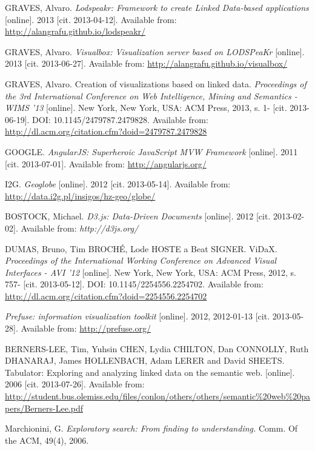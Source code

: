 \begin{thebibliography}{99}
{\sc GRAVES,} Alvaro. 
\emph{Lodspeakr: Framework to create Linked Data-based applications} [online].
2013 [cit. 2013-04-12]. 
Available from: \url{http://alangrafu.github.io/lodspeakr/}

{\sc GRAVES,} Alvaro.
\emph{Visualbox: Visualization server based on LODSPeaKr} [online].
2013 [cit. 2013-06-27].
Available from: \url{http://alangrafu.github.io/visualbox/}

{\sc GRAVES,} Alvaro.
Creation of visualizations based on linked data.
\emph{Proceedings of the 3rd International Conference on Web Intelligence, Mining and Semantics - WIMS '13} [online].
New York, New York, USA: ACM Press, 2013, s. 1- [cit. 2013-06-19].
DOI: 10.1145/2479787.2479828.
Available from: \url{http://dl.acm.org/citation.cfm?doid=2479787.2479828}

{\sc GOOGLE.}
\emph{AngularJS: Superheroic JavaScript MVW Framework} [online]. 2011
[cit. 2013-07-01]. Available from: \url{http://angularjs.org/}

{\sc I2G.}
\emph{Geoglobe} [online]. 2012 [cit. 2013-05-14].
Available from: \url{http://data.i2g.pl/insigos/hz-geo/globe/}

{\sc BOSTOCK}, Michael. 
\emph{D3.js: Data-Driven Documents} [online]. 2012 [cit. 2013-02-02].
Available from: \emph{http://d3js.org/}

{\sc DUMAS,} Bruno, Tim BROCHÉ, Lode HOSTE a Beat SIGNER. ViDaX.
\emph{Proceedings of the International Working Conference on Advanced Visual Interfaces - AVI '12}
[online]. New York, New York, USA: ACM Press, 2012, s. 757-
[cit. 2013-05-12]. DOI: 10.1145/2254556.2254702.
Available from: \url{http://dl.acm.org/citation.cfm?doid=2254556.2254702}

\emph{Prefuse: information visualization toolkit} [online]. 2012, 2012-01-13 [cit. 2013-05-28].
Available from: \url{http://prefuse.org/}

{\sc BERNERS-LEE,} Tim, Yuhsin CHEN, Lydia CHILTON, Dan CONNOLLY,
Ruth DHANARAJ, James HOLLENBACH, Adam LERER and David SHEETS.
Tabulator: Exploring and analyzing linked data on the semantic web.
 [online]. 2006 [cit. 2013-07-26]. 
Available from: \url{http://student.bus.olemiss.edu/files/conlon/others/others/semantic%20web%20papers/Berners-Lee.pdf}

{\sc Marchionini,} G. \emph{Exploratory search: From finding to 
understanding.} Comm. Of the ACM, 49(4), 2006.


\end{thebibliography}
